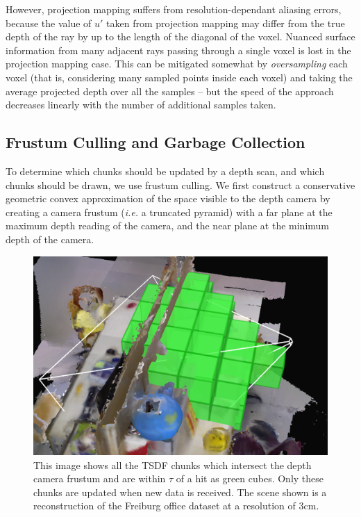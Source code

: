 \documentclass[conference,10pt]{IEEEtran}
\begin{document}
However, projection mapping suffers from resolution-dependant aliasing errors,
because the value of $u'$ taken from projection mapping may differ from the true
depth of the ray by up to the length of the diagonal of the voxel. Nuanced
surface information from many adjacent rays passing through a single voxel is
lost in the projection mapping case. This can be mitigated somewhat by
\textit{oversampling} each voxel (that is, considering many sampled points
inside each voxel) and taking the average projected depth over all the samples
-- but the speed of the approach decreases linearly with the number of
additional samples taken.

\subsection{Frustum Culling and Garbage Collection}
To determine which chunks should be updated by a depth scan, and which chunks
should be drawn, we use frustum culling. We first construct a conservative
geometric convex approximation of the space visible to the depth camera by
creating a camera frustum (\textit{i.e.} a truncated pyramid) with a far plane
at the maximum depth reading of the camera, and the near plane at the minimum
depth of the camera. 

\begin{figure}
  \centering
    \includegraphics[width=1.0\columnwidth]{img/frustum_cull}
      \caption{This image shows all the TSDF chunks which intersect the depth
      camera frustum  and are within $\tau$ of a hit as green cubes. Only
      these chunks are updated when new data is received. The scene shown is a
      reconstruction of the Freiburg office \cite{FREIBURG} dataset at a
      resolution of 3cm.}
  \label{fig:frustum_cull}
\end{figure}
\end{document}
